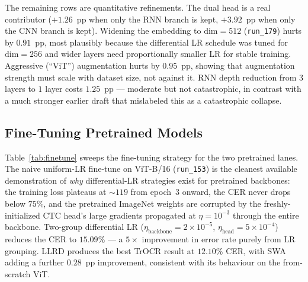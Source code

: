 The remaining rows are quantitative refinements. The dual head is a real contributor ($+1.26$~pp when only the RNN branch is kept, $+3.92$~pp when only the CNN branch is kept). Widening the embedding to $\mathrm{dim} = 512$ (\texttt{run\_179}) hurts by $0.91$~pp, most plausibly because the differential LR schedule was tuned for $\mathrm{dim} = 256$ and wider layers need proportionally smaller LR for stable training. Aggressive (``ViT'') augmentation hurts by $0.95$~pp, showing that augmentation strength must scale with dataset size, not against it. RNN depth reduction from $3$ layers to $1$ layer costs $1.25$~pp --- moderate but not catastrophic, in contrast with a much stronger earlier draft that mislabeled this as a catastrophic collapse.

\subsection{Fine-Tuning Pretrained Models}
\label{sec:res_finetune}

Table~\ref{tab:finetune} sweeps the fine-tuning strategy for the two pretrained lanes. The naive uniform-LR fine-tune on ViT-B/16 (\texttt{run\_153}) is the cleanest available demonstration of \emph{why} differential-LR strategies exist for pretrained backbones: the training loss plateaus at ${\sim}119$ from epoch~$3$ onward, the CER never drops below $75\%$, and the pretrained ImageNet weights are corrupted by the freshly-initialized CTC head's large gradients propagated at $\eta = 10^{-3}$ through the entire backbone. Two-group differential LR ($\eta_{\mathrm{backbone}} = 2 \times 10^{-5}$, $\eta_{\mathrm{head}} = 5 \times 10^{-4}$) reduces the CER to $15.09\%$ --- a $5 \times$ improvement in error rate purely from LR grouping. LLRD produces the best TrOCR result at $12.10\%$ CER, with SWA adding a further $0.28$~pp improvement, consistent with its behaviour on the from-scratch ViT.

